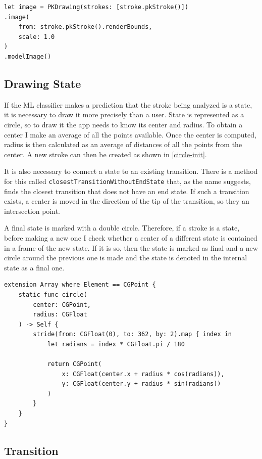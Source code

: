 \begin{lstlisting}[caption=Automata classifier, label=strokes-conversion]
let image = PKDrawing(strokes: [stroke.pkStroke()])
.image(
    from: stroke.pkStroke().renderBounds,
    scale: 1.0
)
.modelImage()
\end{lstlisting}

\subsection{Drawing State}

If the ML classifier makes a prediction that the stroke being analyzed is a state, it is necessary to draw it more precisely than a user. State is represented as a circle, so to draw it the app needs to know its center and radius. To obtain a center I make an average of all the points available. Once the center is computed, radius is then calculated as an average of distances of all the points from the center. A new stroke can then be created as shown in \ref{circle-init}.

It is also necessary to connect a state to an existing transition. There is a method for this called \lstinline{closestTransitionWithoutEndState} that, as the name suggests, finds the closest transition that does not have an end state. If such a transition exists, a center is moved in the direction of the tip of the transition, so they an intersection point.

A final state is marked with a double circle. Therefore, if a stroke is a state, before making a new one I check whether a center of a different state is contained in a frame of the new state. If it is so, then the state is marked as final and a new circle around the previous one is made and the state is denoted in the internal state as a final one.

\begin{lstlisting}[caption=Circle stroke, label=circle-init]
extension Array where Element == CGPoint {
    static func circle(
        center: CGPoint,
        radius: CGFloat
    ) -> Self {
        stride(from: CGFloat(0), to: 362, by: 2).map { index in
            let radians = index * CGFloat.pi / 180
            
            return CGPoint(
                x: CGFloat(center.x + radius * cos(radians)),
                y: CGFloat(center.y + radius * sin(radians))
            )
        }
    }
}
\end{lstlisting}

\subsection{Transition}

